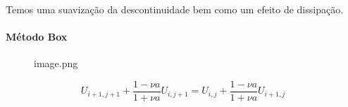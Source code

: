 \documentclass[11pt]{article}
\begin{document}
        

        
        
        

        
    Temos uma suavização da descontinuidade bem como um efeito de
dissipação.

    \hypertarget{muxe9todo-box}{%
\paragraph{Método Box}}

    \begin{figure}
\centering
\caption{image.png}
\end{figure}

    \[U_{i+1,j+1} + \frac{1-\nu a}{1+\nu a}U_{i,j+1} = U_{i,j} + \frac{1-\nu a}{1+\nu a}U_{i+1,j}\]
\end{document}
